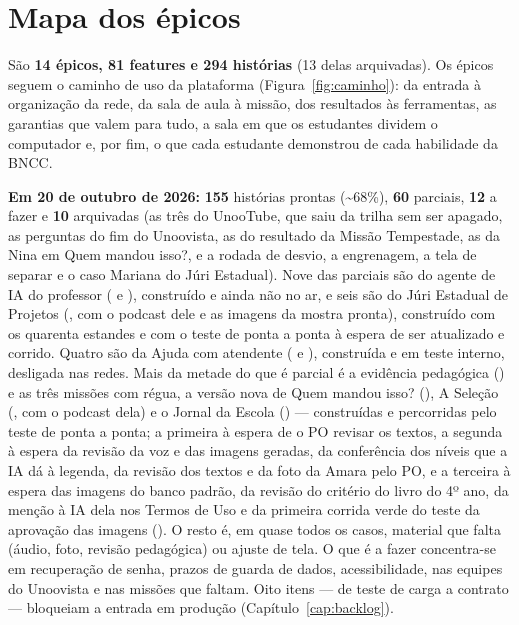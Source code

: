 \chapter{Mapa dos épicos}
\label{cap:mapa}

São \textbf{14 épicos, 81 features e 294 histórias} (13 delas arquivadas). Os épicos seguem o
caminho de uso da plataforma (Figura~\ref{fig:caminho}): da entrada à
organização da rede, da sala de aula à missão, dos resultados às ferramentas,
as garantias que valem para tudo, a sala em que os estudantes dividem o
computador e, por fim, o que cada estudante demonstrou de cada habilidade da
BNCC.

\begin{destaque}
\textbf{Em 20 de outubro de 2026:} \textbf{155} histórias prontas
(\textasciitilde68\%), \textbf{60} parciais, \textbf{12} a fazer e \textbf{10}
arquivadas (as três do UnooTube, que saiu da trilha sem ser apagado, as perguntas do fim do Unoovista, as do resultado da Missão Tempestade, as da Nina em Quem mandou isso?, e a rodada
de desvio, a engrenagem, a tela de separar e o caso Mariana do Júri Estadual). Nove das
parciais são do agente de IA do professor ( e ),
construído e ainda não no ar, e seis são do Júri Estadual de Projetos
(, com o podcast dele e as imagens da mostra pronta), construído com
os quarenta estandes e com o teste de ponta a ponta à espera de ser atualizado
e corrido. Quatro são da Ajuda com atendente ( e
), construída e em teste interno, desligada nas redes. Mais da
metade do que é parcial é a evidência pedagógica () e as três missões
com régua, a versão nova de Quem mandou isso? (), A Seleção
(, com o podcast dela) e o Jornal da Escola () ---
construídas e percorridas pelo teste de ponta a ponta; a primeira à espera de o
PO revisar os textos, a segunda à espera da revisão da voz e das imagens
geradas, da conferência dos níveis que a IA dá à legenda, da revisão dos
textos e da foto da Amara pelo PO, e a terceira à espera das imagens do banco padrão, da revisão
do critério do livro do 4º ano, da menção à IA dela nos Termos de Uso e da
primeira corrida verde do teste da aprovação das imagens (). O resto
é, em quase todos os casos, material que falta (áudio, foto, revisão
pedagógica) ou ajuste de tela. O que é a fazer concentra-se em recuperação de
senha, prazos de guarda de dados, acessibilidade, nas equipes do Unoovista e
nas missões que faltam. Oito itens --- de teste de carga a contrato --- bloqueiam a
entrada em produção (Capítulo~\ref{cap:backlog}).
\end{destaque}

